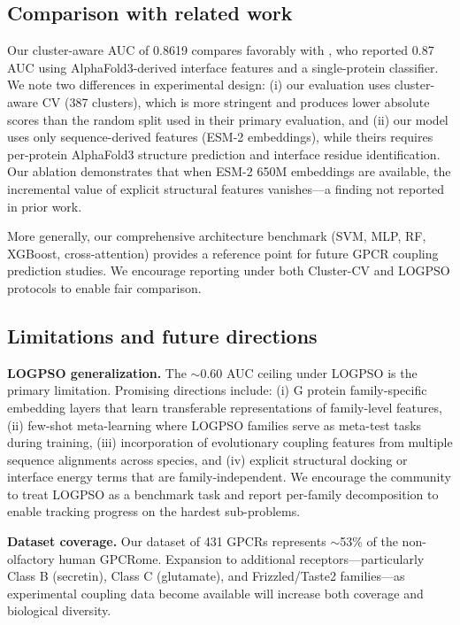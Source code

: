\documentclass[11pt,a4paper]{article}
\begin{document}
\subsection{Comparison with related work}

Our cluster-aware AUC of 0.8619 compares favorably with \cite{miglionico2025predicting}, who reported 0.87 AUC using AlphaFold3-derived interface features and a single-protein classifier. We note two differences in experimental design: (i) our evaluation uses cluster-aware CV (387 clusters), which is more stringent and produces lower absolute scores than the random split used in their primary evaluation, and (ii) our model uses only sequence-derived features (ESM-2 embeddings), while theirs requires per-protein AlphaFold3 structure prediction and interface residue identification. Our ablation demonstrates that when ESM-2 650M embeddings are available, the incremental value of explicit structural features vanishes---a finding not reported in prior work.

More generally, our comprehensive architecture benchmark (SVM, MLP, RF, XGBoost, cross-attention) provides a reference point for future GPCR coupling prediction studies. We encourage reporting under both Cluster-CV and LOGPSO protocols to enable fair comparison.

\subsection{Limitations and future directions}

\textbf{LOGPSO generalization.} The $\sim$0.60 AUC ceiling under LOGPSO is the primary limitation. Promising directions include: (i) G protein family-specific embedding layers that learn transferable representations of family-level features, (ii) few-shot meta-learning where LOGPSO families serve as meta-test tasks during training, (iii) incorporation of evolutionary coupling features from multiple sequence alignments across species, and (iv) explicit structural docking or interface energy terms that are family-independent. We encourage the community to treat LOGPSO as a benchmark task and report per-family decomposition to enable tracking progress on the hardest sub-problems.

\textbf{Dataset coverage.} Our dataset of 431 GPCRs represents $\sim$53\% of the non-olfactory human GPCRome. Expansion to additional receptors---particularly Class B (secretin), Class C (glutamate), and Frizzled/Taste2 families---as experimental coupling data become available will increase both coverage and biological diversity.
\end{document}
